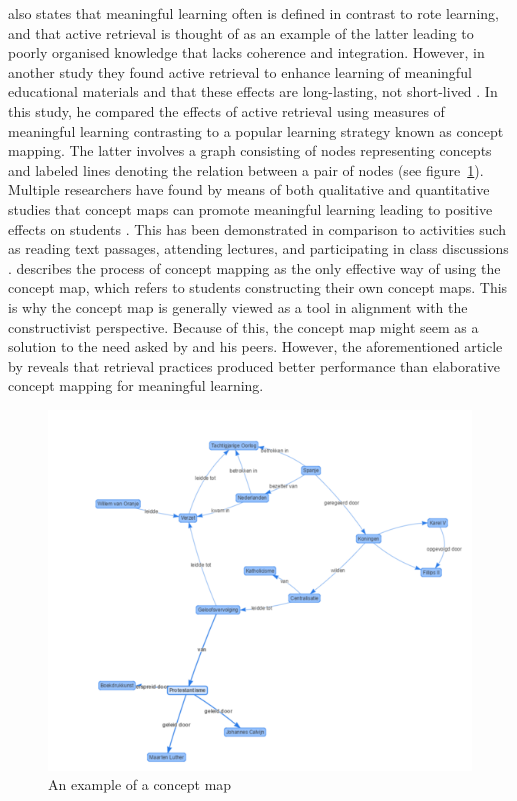  also states that meaningful learning often is defined in contrast to rote learning, and that active retrieval is thought of as an example of the latter leading to poorly organised knowledge that lacks coherence and integration. However, in another study they found active retrieval to enhance learning of meaningful educational materials and that these effects are long-lasting, not short-lived \cite{karpicke2}. In this study, he compared the effects of active retrieval using measures of meaningful learning contrasting to a popular learning strategy known as concept mapping. The latter involves a graph consisting of nodes representing concepts and labeled lines denoting the relation between a pair of nodes \cite{ruiz1} (see figure~\ref{fig:conceptmap}). Multiple researchers have found by means of both qualitative and quantitative studies that concept maps can promote meaningful learning leading to positive effects on students \cite{hwang2, subramaniam, canas}. This has been demonstrated in comparison to activities such as reading text passages, attending lectures, and participating in class discussions \cite{singh, nesbit2}.  describes the process of concept mapping as the only effective way of using the concept map, which refers to students constructing their own concept maps. This is why the concept map is generally viewed as a tool in alignment with the constructivist perspective. Because of this, the concept map might seem as a solution to the need asked by  and his peers. However, the aforementioned article by  reveals that retrieval practices produced better performance than elaborative concept mapping for meaningful learning.

\begin{figure}
    \centering
    \includegraphics[width=\textwidth]{img/conceptmap}
    \caption{An example of a concept map}
    \label{fig:conceptmap}
\end{figure}

